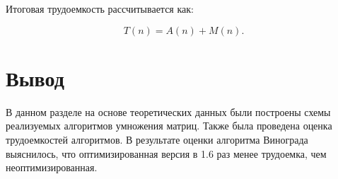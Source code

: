 Итоговая трудоемкость рассчитывается как:

\begin{equation}
    T(n) = A(n) + M(n).
\end{equation}

\section*{Вывод}

В данном разделе на основе теоретических данных были построены схемы реализуемых алгоритмов умножения матриц.
Также была проведена оценка трудоемкостей алгоритмов.
В результате оценки алгоритма Винограда выяснилось, что оптимизированная версия в 1.6 раз менее трудоемка, чем неоптимизированная.